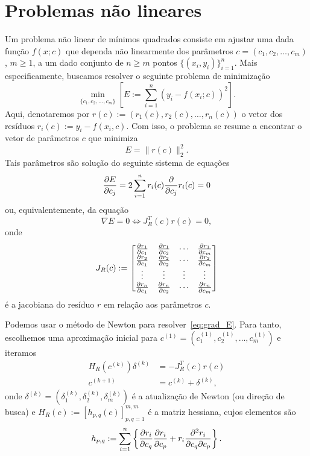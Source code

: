 \section{Problemas não lineares}\label{cap_ajuste_sec_prob_nlin}

Um problema não linear de mínimos quadrados consiste em ajustar uma dada função $f(x;c)$ que dependa não linearmente dos parâmetros $c = (c_1, c_2, \dotsc, c_m)$, $m\geq 1$, a um dado conjunto de $n\geq m$ pontos $\{(x_i, y_i)\}_{i=1}^n$. Mais especificamente, buscamos resolver o seguinte problema de minimização
\begin{equation}\label{eq:prob_nlin_mq}
  \min_{\{c_1, c_2, \dotsc, c_m\}} \left[E := \sum_{i=1}^n \left(y_i - f(x_i;c)\right)^2\right].
\end{equation}
Aqui, denotaremos por $r(c) := (r_1(c), r_2(c), \dotsc, r_n(c))$ o vetor dos resíduos $r_i(c) := y_i - f(x_i,c)$. Com isso, o problema se resume a encontrar o vetor de parâmetros $c$ que minimiza
\begin{equation}
  E = \|r(c)\|_2^2.
\end{equation}
Tais parâmetros são solução do seguinte sistema de equações
\begin{equation}
  \frac{\partial E}{\partial c_j} = 2\sum_{i=1}^n r_i(c)\frac{\partial}{\partial c_j}r_i(c) = 0
\end{equation}
ou, equivalentemente, da equação
\begin{equation}\label{eq:grad_E}
  \nabla E = 0 \Leftrightarrow J_R^T(c)r(c) = 0,
\end{equation}
onde
\begin{equation}
  J_R(c) :=
  \begin{bmatrix}
    \frac{\partial r_1}{\partial c_1} & \frac{\partial r_1}{\partial c_2} & \cdots & \frac{\partial r_1}{\partial c_m}\\
    \frac{\partial r_2}{\partial c_1} & \frac{\partial r_2}{\partial c_2} & \cdots & \frac{\partial r_2}{\partial c_m}\\
    \vdots  & \vdots & \vdots & \vdots \\
    \frac{\partial r_n}{\partial c_1} & \frac{\partial r_n}{\partial c_2} & \cdots & \frac{\partial r_n}{\partial c_m}
  \end{bmatrix}
\end{equation}
é a jacobiana do resíduo $r$ em relação aos parâmetros $c$.

Podemos usar o método de Newton para resolver~\eqref{eq:grad_E}. Para tanto, escolhemos uma aproximação inicial para $c^{(1)} = (c_1^{(1)}, c_2^{(1)}, \dotsc, c_m^{(1)})$ e iteramos
\begin{align}
  H_R(c^{(k)})\delta^{(k)} &= -J_R^T(c)r(c) \label{eq:mqnl_newton1}\\
  c^{(k+1)} &= c^{(k)} + \delta^{(k)} \label{eq:mqnl_newton2},
\end{align}
onde $\delta^{(k)} = (\delta_1^{(k)}, \delta_2^{(k)}, \delta_m^{(k)})$ é a atualização de Newton (ou direção de busca) e $H_R(c) := [h_{p,q}(c)]_{p,q=1}^{m,m}$ é a matriz hessiana, cujos elementos são
\begin{equation}
  h_{p,q} := \sum_{i=1}^n\left\{\frac{\partial r_i}{\partial c_q}\frac{\partial r_i}{\partial c_p} + r_i\frac{\partial^2 r_i}{\partial c_q\partial c_p}\right\}.
\end{equation}

